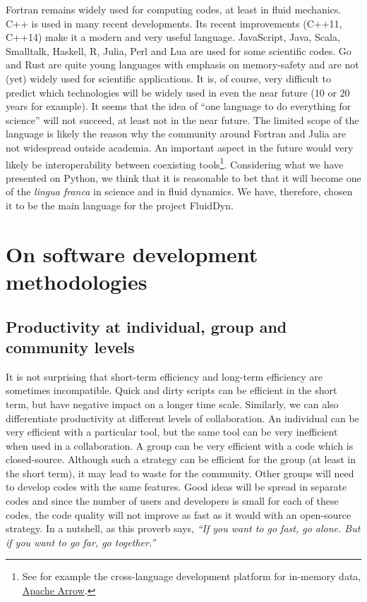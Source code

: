 Fortran remains widely used for computing codes, at least in fluid mechanics.
C++ is used in many recent developments. Its recent improvements (C++11, C++14)
make it a modern and very useful language.
%
JavaScript, Java, Scala, Smalltalk, Haskell, R, Julia, Perl and Lua are used for
some scientific codes. Go and Rust are quite young languages with emphasis on
memory-safety and are not (yet) widely used for scientific applications.
%
It is, of course, very difficult to predict which technologies will be widely
used in even the near future (10 or 20 years for example).
%
It seems that the idea of ``one language to do everything for science'' will
not succeed, at least not in the near future.
%
The limited scope of the language is likely the reason why the community
around Fortran and Julia are not widespread outside academia.
%
An important aspect in the future would very likely be interoperability
between coexisting tools\footnote{See for example the cross-language development
platform for in-memory data, \href{https://arrow.apache.org/}{Apache Arrow}.}.
%
Considering what we have presented on Python, we think that it is reasonable to
bet that it will become one of the \textit{lingua franca} in science and in
fluid dynamics.
%
We have, therefore, chosen it to be the main language for the project FluidDyn.

\section{On software development methodologies}

\subsection{Productivity at individual, group and community levels}

It is not surprising
%
that short-term efficiency and long-term efficiency are sometimes incompatible.
%
Quick and dirty scripts can be efficient in the short term, but have negative
impact on a longer time scale.
%
Similarly, we can also differentiate productivity at different levels of
collaboration.
%
An individual can be very efficient with a particular tool, but the same tool
can be very inefficient when used in a collaboration.
%
A group can be very efficient with a code which is closed-source. Although such
a strategy can be efficient for the group (at least in the short term), it may
lead to waste for the community. Other groups will need to develop codes with
the same features.
%
Good ideas will be spread in separate codes and since the number of users and
developers is small for each of these codes, the code quality will not
improve as fast as it would with an open-source strategy. In a nutshell, as
this proverb says, \textit{``If you want to go fast, go alone. But if you want
to go far, go together.''}

